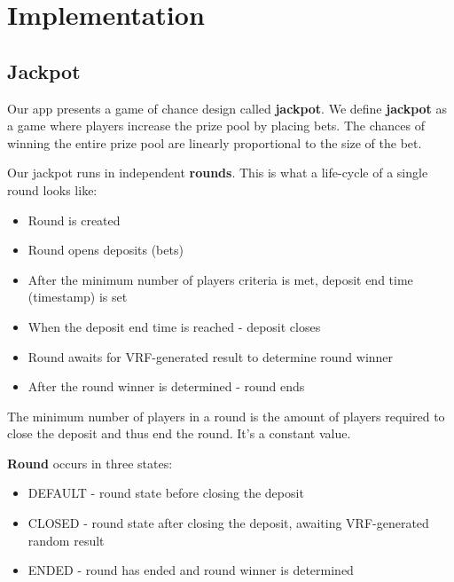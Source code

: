 \documentclass[12pt]{article}
\begin{document}

\newpage
\section{Implementation}
\subsection{Jackpot}

Our app presents a game of chance design called \textbf{jackpot}. We define \textbf{jackpot} as a game where players increase the prize pool by placing bets. The chances of winning the entire prize pool are linearly proportional to the size of the bet.

Our jackpot runs in independent \textbf{rounds}. This is what a life-cycle of a single round looks like:

\begin{itemize}
    \item Round is created
    \item Round opens deposits (bets)
    \item After the minimum number of players criteria is met, deposit end time (timestamp) is set 
    \item When the deposit end time is reached - deposit closes
    \item Round awaits for VRF-generated result to determine round winner
    \item After the round winner is determined - round ends
\end{itemize}

The minimum number of players in a round is the amount of players required to close the deposit and thus end the round. It's a constant value.

\hfill

\textbf{Round} occurs in three states:
\begin{itemize}
    \item DEFAULT - round state before closing the deposit
    \item CLOSED - round state after closing the deposit, awaiting VRF-generated random result
    \item ENDED - round has ended and round winner is determined
\end{itemize}

\hfill
\end{document}

